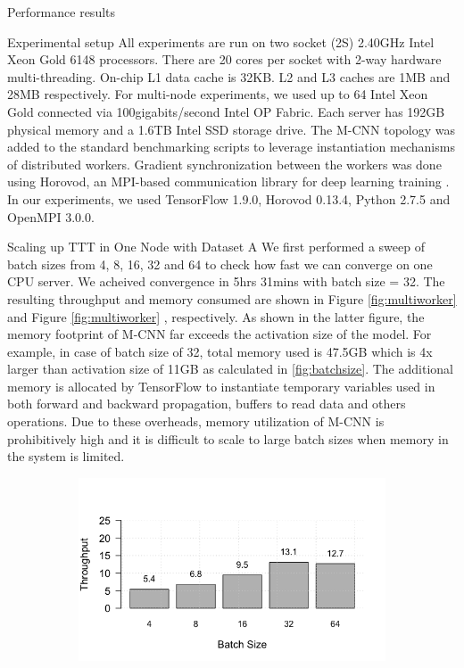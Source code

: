 \begin{section}{Performance results}
	\label{sec:performance}
	\begin{subsection}{Experimental setup}
		\label{sec:setup}
		All experiments are run on two socket (2S) 2.40GHz Intel\textregistered{} Xeon\textregistered{} Gold 6148 processors. There are 20 cores per socket with 2-way hardware multi-threading. On-chip L1 data cache is 32KB. L2 and L3 caches are 1MB and 28MB respectively. For multi-node experiments, we used up to 64 Intel\textregistered{} Xeon\textregistered{} Gold connected via 100gigabits/second Intel\textregistered{} OP Fabric. Each server has 192GB physical memory and a 1.6TB Intel SSD storage drive. The M-CNN topology was added to the standard benchmarking scripts \cite{GoogleTPU} to leverage instantiation mechanisms of distributed workers. Gradient synchronization between the workers was done using Horovod, an MPI-based communication library for deep learning training \cite{Horovod}. In our experiments, we used TensorFlow 1.9.0, Horovod 0.13.4, Python 2.7.5 and OpenMPI 3.0.0.
	\end{subsection}
	\begin{subsection}{Scaling up TTT in One Node with Dataset A}
		\label{sec:scaleup}
\noindent We first performed a sweep of batch sizes from 4, 8, 16, 32 and 64 to check how fast we can converge on one CPU server. We acheived convergence in 5hrs 31mins with batch size = 32. The resulting throughput and memory consumed are shown in Figure \ref{fig:multiworker}  and Figure \ref{fig:multiworker} , respectively. As shown in the latter figure, the memory footprint of M-CNN far exceeds the activation size of the model. For example, in case of batch size of 32, total memory used is 47.5GB which is 4x larger than activation size of 11GB as calculated in \autoref{fig:batchsize}. The additional memory is allocated by TensorFlow to instantiate temporary variables used in both forward and backward propagation, buffers to read data and others operations. Due to these overheads, memory utilization of M-CNN is prohibitively high and it is difficult to scale to large batch sizes when memory in the system is limited. \\
		\begin{figure}[t]
	\centering
	\begin{subfigure}[t]{0.45\textwidth}
		\centering
		\includegraphics[width=\textwidth]{wgrid_figure3a.png}

\end{subfigure}
\end{figure}
\end{subsection}
\end{section}
